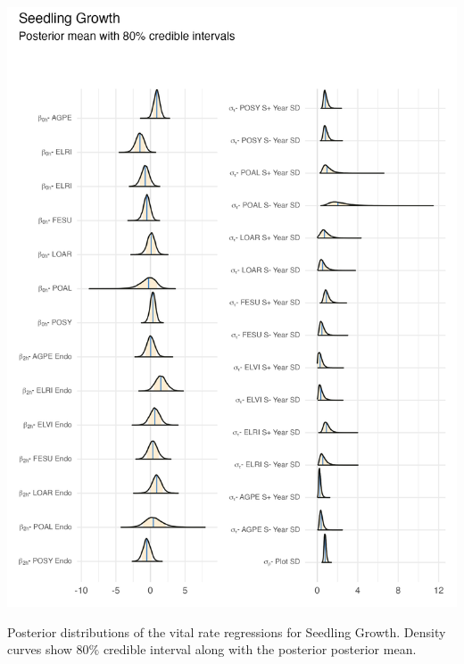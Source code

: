 \documentclass[lineno, sn-basic]{sn-jnl}%
\begin{document}
\begin{myfigure}[H]
	\centering
	\includegraphics[width = \linewidth]{seedgrow_posteriors_plot.png}
	\caption[Posterior distributions of the vital rate regressions for Seedling Growth]{Posterior distributions of the vital rate regressions for Seedling Growth. Density curves show $80\%$ credible interval along with the posterior posterior mean.}
\end{myfigure}
\end{document}
